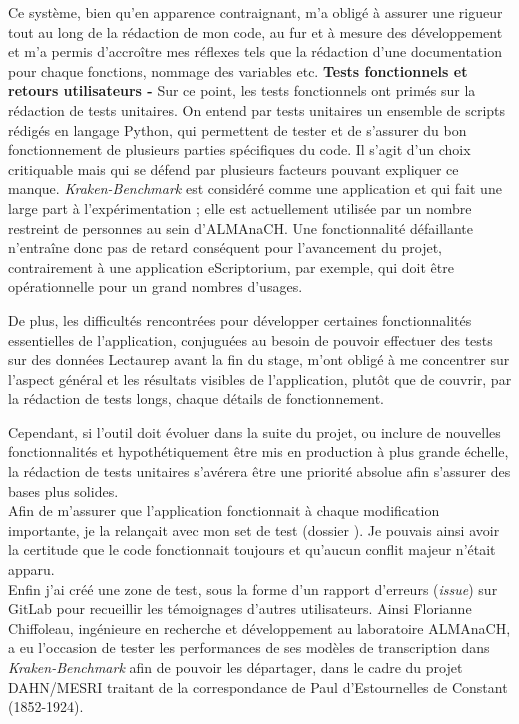 Ce système, bien qu'en apparence contraignant, m'a obligé à assurer une rigueur tout au long de la rédaction de mon code, au fur et à mesure des développement et m'a permis d'accroître mes réflexes tels que la rédaction d'une documentation pour chaque fonctions, nommage des variables etc.
\newpage
\textbf{Tests fonctionnels et retours utilisateurs - } Sur ce point, les tests fonctionnels ont primés sur la rédaction de tests unitaires. On entend par tests unitaires un ensemble de scripts rédigés en  langage Python, qui permettent de tester et de s'assurer du bon fonctionnement de plusieurs parties spécifiques du code. Il s'agit d'un choix critiquable mais qui se défend par plusieurs facteurs pouvant expliquer ce manque. \textit{Kraken-Benchmark} est considéré comme une application  et qui fait une large part à l'expérimentation ; elle est actuellement utilisée par un nombre restreint de personnes au sein d'ALMAnaCH. Une fonctionnalité défaillante n'entraîne donc pas de retard conséquent pour l'avancement du projet, contrairement à une application eScriptorium, par exemple, qui doit être opérationnelle pour un grand nombres d'usages. 

De plus, les difficultés rencontrées pour développer certaines fonctionnalités essentielles de l'application, conjuguées au besoin de pouvoir effectuer des tests sur des données Lectaurep avant la fin du stage, m'ont obligé à me concentrer sur l'aspect général et les résultats visibles de l'application, plutôt que de couvrir, par la rédaction de tests longs, chaque détails de fonctionnement.

Cependant, si l'outil doit évoluer dans la suite du projet, ou inclure de nouvelles fonctionnalités et hypothétiquement être mis en production à plus grande échelle, la rédaction de tests unitaires s'avérera être une priorité absolue afin s'assurer des bases plus solides.\\

Afin de m'assurer que l'application fonctionnait à chaque modification importante, je la relançait avec mon set de test (dossier ). Je pouvais ainsi avoir la certitude que le code fonctionnait toujours et qu'aucun conflit majeur n'était apparu.\\

Enfin j'ai créé une zone de test, sous la forme d'un rapport d'erreurs (\textit{issue}) sur GitLab pour recueillir les témoignages d'autres utilisateurs. Ainsi Florianne Chiffoleau, ingénieure en recherche et développement au laboratoire  ALMAnaCH, a eu l'occasion de tester les performances de ses modèles de transcription dans \textit{Kraken-Benchmark} afin de pouvoir les départager, dans le cadre du projet DAHN/MESRI traitant de la correspondance de Paul d'Estournelles de Constant (1852-1924).\\

